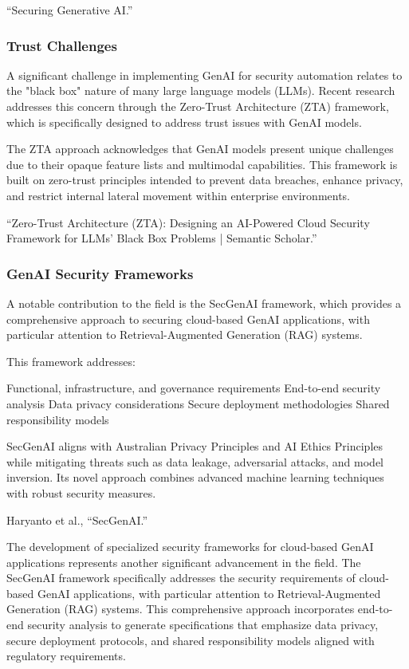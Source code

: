 “Securing Generative AI.”


\subsubsection{Trust Challenges} %
\label{sec:Trust Challenges}

A significant challenge in implementing GenAI for security automation relates to the "black box" nature of many large language models (LLMs). Recent research addresses this concern through the Zero-Trust Architecture (ZTA) framework, which is specifically designed to address trust issues with GenAI models.

The ZTA approach acknowledges that GenAI models present unique challenges due to their opaque feature lists and multimodal capabilities. This framework is built on zero-trust principles intended to prevent data breaches, enhance privacy, and restrict internal lateral movement within enterprise environments.

“Zero-Trust Architecture (ZTA): Designing an AI-Powered Cloud Security Framework for LLMs’ Black Box Problems | Semantic Scholar.”


\subsubsection{GenAI Security Frameworks} %
\label{sec:GenAI Security Frameworks}

A notable contribution to the field is the SecGenAI framework, which provides a comprehensive approach to securing cloud-based GenAI applications, with particular attention to Retrieval-Augmented Generation (RAG) systems.

This framework addresses:

Functional, infrastructure, and governance requirements
End-to-end security analysis
Data privacy considerations
Secure deployment methodologies
Shared responsibility models

SecGenAI aligns with Australian Privacy Principles and AI Ethics Principles while mitigating threats such as data leakage, adversarial attacks, and model inversion. Its novel approach combines advanced machine learning techniques with robust security measures.

Haryanto et al., “SecGenAI.”

The development of specialized security frameworks for cloud-based GenAI applications represents another significant advancement in the field. The SecGenAI framework specifically addresses the security requirements of cloud-based GenAI applications, with particular attention to Retrieval-Augmented Generation (RAG) systems. This comprehensive approach incorporates end-to-end security analysis to generate specifications that emphasize data privacy, secure deployment protocols, and shared responsibility models aligned with regulatory requirements.

